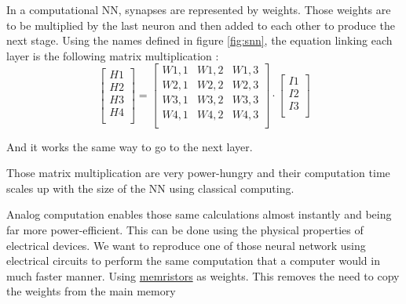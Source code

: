 In a computational \ac{NN}, synapses are represented by weights. Those weights are to be multiplied by the last neuron and then added to each other to produce the next stage. Using the names defined in figure \ref{fig:snn}, the equation linking each layer is the following matrix multiplication :
\begin{equation}
  \begin{bmatrix}
    H1\\ H2\\ H3\\ H4\\
  \end{bmatrix}
  =
  \begin{bmatrix}
    W1,1 & W1,2 & W1,3\\
    W2,1 & W2,2 & W2,3\\
    W3,1 & W3,2 & W3,3\\
    W4,1 & W4,2 & W4,3\\
  \end{bmatrix}
  \cdot
  \begin{bmatrix}
    I1\\ I2\\ I3\\
  \end{bmatrix}
\end{equation}

And it works the same way to go to the next layer.


Those matrix multiplication are very power-hungry and their computation time scales up with the size of the \ac{NN} using classical computing.

Analog computation enables those same calculations almost instantly and being far more power-efficient. This can be done using the physical properties of electrical devices.
We want to reproduce one of those neural network using electrical circuits to perform the same computation that a computer would in much faster manner.
Using \hyperref[subsec:memristors]{memristors} as weights. This removes the need to copy the weights from the main memory

